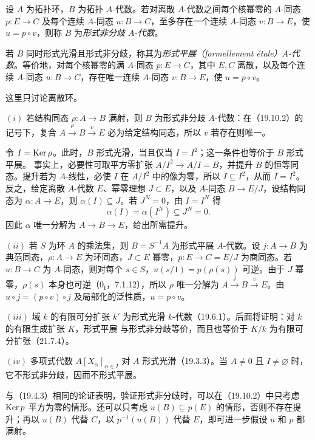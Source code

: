 设 $A$ 为拓扑环，$B$ 为拓扑 $A$-代数。若对离散 $A$-代数之间每个核幂零的 $A$-同态 $p:E\to C$ 及每个连续 $A$-同态 $u:B\to C$，至多存在一个连续 $A$-同态 $v:B\to E$，使 $u=p\circ v$，则称 $B$ 为\emph{形式非分歧 $A$-代数}。

若 $B$ 同时形式光滑且形式非分歧，称其为\emph{形式平展（formellement étale）$A$-代数}。等价地，对每个核幂零的满 $A$-同态 $p:E\to C$，其中 $E,C$ 离散，以及每个连续 $A$-同态 $u:B\to C$，存在唯一连续 $A$-同态 $v:B\to E$，使 $u=p\circ v$。

这里只讨论离散环。

$(i)$ 若结构同态 $\rho:A\to B$ 满射，则 $B$ 为形式非分歧 $A$-代数：在（19.10.2）的记号下，复合 $A\xrightarrow{\rho}B\xrightarrow{v}E$ 必为给定结构同态，所以 $v$ 若存在则唯一。

令 $I=\operatorname{Ker}\rho$。此时，$B$ 形式光滑，当且仅当 $I=I^2$；这一条件也等价于 $B$ 形式平展。
事实上，必要性可取平方零扩张 $A/I^2\to A/I=B$，并提升 $B$ 的恒等同态。提升若为 $A$-线性，必使 $I$ 在 $A/I^2$ 中的像为零，所以 $I\subseteq I^2$，从而 $I=I^2$。反之，给定离散 $A$-代数 $E$、幂零理想 $J\subset E$，以及 $A$-同态 $B\to E/J$，设结构同态为 $\alpha:A\to E$，则 $\alpha(I)\subseteq J$。若 $J^N=0$，由 $I=I^N$ 得
\[
 \alpha(I)=\alpha(I^N)\subseteq J^N=0.
\]
因此 $\alpha$ 唯一分解为 $A\to B\to E$，给出所需提升。

$(ii)$ 若 $S$ 为环 $A$ 的乘法集，则 $B=S^{-1}A$ 为形式平展 $A$-代数。设 $j:A\to B$ 为典范同态，$\rho:A\to E$ 为环同态，$J\subset E$ 幂零，$p:E\to C=E/J$ 为商同态。若 $u:B\to C$ 为 $A$-同态，则对每个 $s\in S$，$u(s/1)=p(\rho(s))$ 可逆。由于 $J$ 幂零，$\rho(s)$ 本身也可逆（$0_{\mathrm I}$，7.1.12），所以 $\rho$ 唯一分解为 $A\xrightarrow{j}B\xrightarrow{v}E$。由 $u\circ j=(p\circ v)\circ j$ 及局部化的泛性质，$u=p\circ v$。

$(iii)$ 域 $k$ 的有限可分扩张 $k'$ 为形式光滑 $k$-代数（19.6.1）。后面将证明：对 $k$ 的有限生成扩张 $K$，形式平展 与形式非分歧等价，而且也等价于 $K/k$ 为有限可分扩张（21.7.4）。

$(iv)$ 多项式代数 $A[X_\alpha]_{\alpha\in I}$ 对 $A$ 形式光滑（19.3.3）。当 $A\ne0$ 且 $I\ne\varnothing$ 时，它不形式非分歧，因而不形式平展。

与（19.4.3）相同的论证表明，验证形式非分歧时，可以在（19.10.2）中只考虑 $\operatorname{Ker} p$ 平方为零的情形。还可以只考虑 $u(B)\subseteq p(E)$ 的情形，否则不存在提升；再以 $u(B)$ 代替 $C$，以 $p^{-1}(u(B))$ 代替 $E$，即可进一步假设 $u$ 和 $p$ 都满射。
